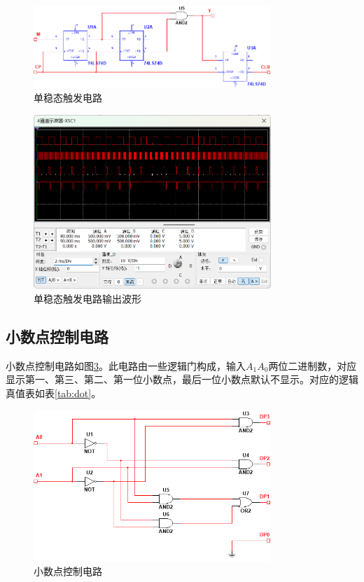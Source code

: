 \documentclass[12pt]{article}
\begin{document}
\begin{figure}[H]
    \centering
    \includegraphics[width=0.8\textwidth]{./fig/monostable.png}
    \caption{单稳态触发电路}
    \label{fig:monostable}
\end{figure}

\begin{figure}[H]
    \centering
    \includegraphics[width=0.8\textwidth]{./fig/monostableWave.png}
    \caption{单稳态触发电路输出波形}
    \label{fig:monostableWave}
\end{figure}

\subsection{小数点控制电路}

小数点控制电路如图\ref*{fig:dot}。此电路由一些逻辑门构成，输入$A_1A_0$两位二进制数，对应显示第一、第三、第二、第一位小数点，最后一位小数点默认不显示。对应的逻辑真值表如表\ref*{tab:dot}。

\begin{figure}[H]
    \centering
    \includegraphics[width=0.8\textwidth]{./fig/dot.png}
    \caption{小数点控制电路}
    \label{fig:dot}
\end{figure}
\end{document}
